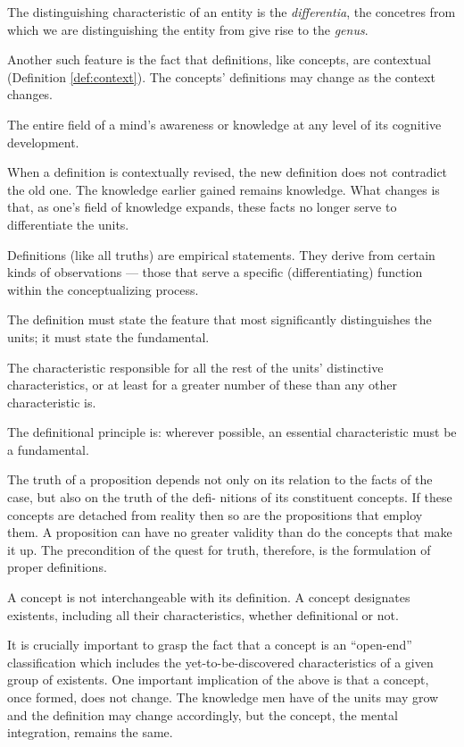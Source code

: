         The distinguishing characteristic of an entity is the \textit{differentia}, the concetres from which we are distinguishing the entity from give rise to the \textit{genus}.

        Another such feature is the fact that definitions, like concepts, are contextual (Definition \ref{def:context}). The concepts' definitions may change as the context changes.

            \begin{definition}[Context]
            \label{def:context}
                The entire field of a mind's awareness or knowledge at any level of its cognitive development.
            \end{definition}

        When a definition is contextually revised, the new definition does not contradict the old one. The knowledge earlier gained remains knowledge. What changes is that, as one's field of knowledge expands, these facts no longer serve to differentiate the units.

        Definitions (like all truths) are  empirical statements. They derive from certain kinds of observations — those that serve a specific (differentiating) function within the conceptualizing process.

        The definition must state the feature that most significantly distinguishes the units; it must state the fundamental. 

            \begin{definition}[Fundamental]
            \label{def:fundamental}
                The characteristic responsible for all the rest of the units' distinctive characteristics, or at least for a greater number of these than any other characteristic is.
            \end{definition}

        The definitional principle is: wherever possible, an essential characteristic must be a fundamental.

        The truth of a proposition depends not only on its relation to the facts of the case, but also on the truth of the defi- nitions of its constituent concepts. If these concepts are detached from reality then so are the propositions that employ them. A proposition can have no greater validity than do the concepts that make it up. The precondition of the quest for truth, therefore, is the formulation of proper definitions.

        A concept is not interchangeable with its definition. A concept designates existents, including all their characteristics, whether definitional or not.

        It is crucially important to grasp the fact that a concept is an ``open-end'' classification which includes the yet-to-be-discovered characteristics of a given group of existents. One important implication of the above is that a concept, once formed, does not change. The knowledge men have of the units may grow and the definition may change accordingly, but the concept, the mental integration, remains the same. 






